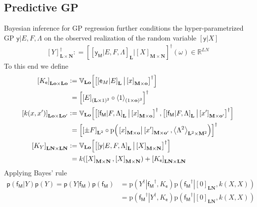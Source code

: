 \documentclass[preprint,12pt]{elsarticle}
\newcommand*{\M}[1]{\ensuremath{#1}\xspace}
\newcommand*{\x}{\times}
\newcommand*{\mi}[1]{\mathbf{#1}}
\newcommand*{\st}[1]{\mathbb{#1}}
\newcommand*{\rv}[1]{\mathsf{#1}}
\newcommand*{\te}[2][]{\left\lbrack{#2}\right\rbrack_{#1}}
\newcommand*{\diag}[2][]{\left\langle{#2}\right\rangle_{#1}}
\newcommand*{\prob}[3]{\M{\mathrm{p}\!\left(\left.{#1}\right\vert{#2,#3}\right)}}
\newcommand*{\deq}{\M{\mathrel{\mathop:}=}}
\newcommand*{\cov}[3][]{\ifthenelse{\equal{#1}{}}{\mathbb{V}_{#3}\!\left\lbrack{#2}\right\rbrack}{\mathbb{V}_{#3}\!\left\lbrack{#2,#1}\right\rbrack}}
\begin{document}
    \subsection{Predictive GP} \label{sub:GPR:Predictive}
        Bayesian inference for GP regression further conditions the hyper-parametrized GP $\rv{y} \vert E,F,\Lambda$ on the observed realization of the random variable $\te{\rv{y}\vert X}$
        \begin{equation*}
            \te[\mi{L} \x \mi{N}]{Y}^{\dagger} \deq \te{\te[\mi{L}]{\rv{y_M}\vert E,F,\Lambda} \big\vert \te[\mi{M}\x\mi{N}]{X}}^{\dagger}\!(\omega) \in \st{R}^{LN}
        \end{equation*}
        To this end we define
        \begin{equation} \label{def:GPR:Kk}
            \begin{aligned}
                \te[\mi{Lo}\x\mi{Lo}]{K_{\rv{e}}} &\deq 
                \cov{\te{\te[\mi{L}]{\rv{e}_{M}\vert E} \big\vert \te[\mi{M}\x\mi{o}]{x}}^{\dagger}}{\mi{Lo}} \\
                &\phantom{:}= \te{\te[(\mi{L}\x 1)^2]{E} \circ \diag[(1\x\mi{o})^2]{1}}^{\dagger} \\
                \te[\mi{Lo}\x\mi{L o^{\prime}}]{k(x, x^{\prime})} &\deq
                \cov[{\te{\te[\mi{L}]{\rv{f_M}\vert F,\Lambda} \big\vert \te[\mi{M}\x\mi{o^{\prime}}]{x^{\prime}}}^{\dagger}}]
                {\te{\te[\mi{L}]{\rv{f_M}\vert F,\Lambda} \big\vert \te[\mi{M}\x\mi{o}]{x}}^{\dagger}}{\mi{Lo}} \\
                &\phantom{:}= \te{\te[\mi{L}^{2}]{\pm F} \circ 
                \prob{\te[\mi{M}\x\mi{o}]{x}}{\te[\mi{M}\x\mi{o^{\prime}}]{x^{\prime}}}
                {\diag[\mi{L}^{2}\x\mi{M}^{2}]{\Lambda^{2}}}}^{\dagger} \\
                \te[\mi{LN}\x\mi{LN}]{K_{Y}} &\deq 
                \cov{\te{\te[\mi{L}]{\rv{y}\vert E,F,\Lambda} \big\vert \te[\mi{M}\x\mi{N}]{X}}^{\dagger}}{\mi{Lo}} \\
                &\phantom{:}= k(\te[\mi{M}\x\mi{N}]{X},\te[\mi{M}\x\mi{N}]{X}) + \te[\mi{LN}\x\mi{LN}]{K_{\rv{e}}}
            \end{aligned}
        \end{equation}
        Applying Bayes' rule
        \begin{equation*}
            \begin{aligned}
                \mathsf{p}(\rv{f_M}\vert Y)\mathsf{p}(Y) = \mathsf{p}(Y\vert \rv{f_M})\mathsf{p}(\rv{f_M})
                &= \prob{Y^{\dagger}}{\rv{f_M}^{\dagger}}{K_{\rv{e}}} \prob{\rv{f_M}^{\dagger}}{\te[\mi{LN}]{0}}{k(X,X)} \\
                &= \prob{\rv{f_M}^{\dagger}}{Y^{\dagger}}{K_{\rv{e}}} \prob{\rv{f_M}^{\dagger}}{\te[\mi{LN}]{0}}{k(X,X)}
            \end{aligned}
        \end{equation*}
\end{document}
